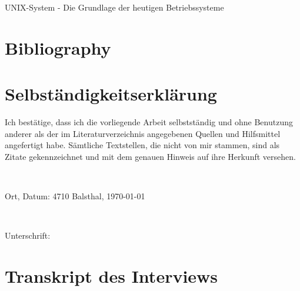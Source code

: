 \documentclass[a4paper, 11pt]{article}
\begin{document}
    \begin{titlepage}
        \centering
        \vspace*{120pt}
        \LARGE UNIX-System - Die Grundlage der heutigen Betriebssysteme \par
        \vspace{0.5cm}
        \Large \subtitle{wissenschaftliche Arbeit} \par
        \vfill
    \end{titlepage}
    \newpage


    
    \newpage


    \tableofcontents
    \newpage


    
    \newpage


    
    \newpage


    
    \newpage


    
    \newpage


    
    \newpage


    
    \newpage


    \section{Bibliography}
    \printbibliography[heading=none]
    \nocite{*}
    \newpage


    \section{Selbständigkeitserklärung}
    Ich bestätige, dass ich die vorliegende Arbeit selbstständig und ohne Benutzung anderer als der im Literaturverzeichnis angegebenen Quellen und Hilfsmittel angefertigt habe.
    Sämtliche Textstellen, die nicht von mir stammen, sind als Zitate gekennzeichnet und mit dem genauen Hinweis auf ihre Herkunft versehen.

    \

    Ort, Datum: \hspace{120pt} 4710 Balsthal, \today

    \

    Unterschrift:
    \newpage


    \appendix
    \section{Transkript des Interviews}
    
\end{document}
